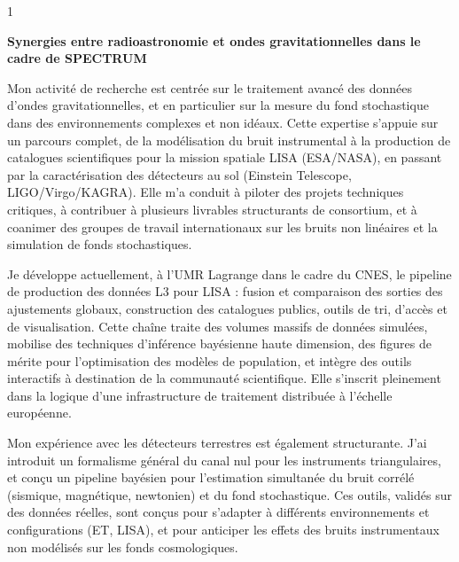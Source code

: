 \documentclass[10pt,a4paper]{../_shared/altacv}
\begin{document}
\makecvheader


\begin{paracol}{1}



{\color{body}
\textbf{Synergies entre radioastronomie et ondes gravitationnelles dans le cadre de SPECTRUM}

Mon activité de recherche est centrée sur le traitement avancé des données d'ondes gravitationnelles, et en particulier sur la mesure du fond stochastique dans des environnements complexes et non idéaux. Cette expertise s'appuie sur un parcours complet, de la modélisation du bruit instrumental à la production de catalogues scientifiques pour la mission spatiale LISA (ESA/NASA), en passant par la caractérisation des détecteurs au sol (Einstein Telescope, LIGO/Virgo/KAGRA). Elle m'a conduit à piloter des projets techniques critiques, à contribuer à plusieurs livrables structurants de consortium, et à coanimer des groupes de travail internationaux sur les bruits non linéaires et la simulation de fonds stochastiques.

Je développe actuellement, à l'UMR Lagrange dans le cadre du CNES, le pipeline de production des données L3 pour LISA : fusion et comparaison des sorties des ajustements globaux, construction des catalogues publics, outils de tri, d'accès et de visualisation. Cette chaîne traite des volumes massifs de données simulées, mobilise des techniques d'inférence bayésienne haute dimension, des figures de mérite pour l'optimisation des modèles de population, et intègre des outils interactifs à destination de la communauté scientifique. Elle s'inscrit pleinement dans la logique d'une infrastructure de traitement distribuée à l'échelle européenne.

Mon expérience avec les détecteurs terrestres est également structurante. J'ai introduit un formalisme général du canal nul pour les instruments triangulaires, et conçu un pipeline bayésien pour l'estimation simultanée du bruit corrélé (sismique, magnétique, newtonien) et du fond stochastique. Ces outils, validés sur des données réelles, sont conçus pour s'adapter à différents environnements et configurations (ET, LISA), et pour anticiper les effets des bruits instrumentaux non modélisés sur les fonds cosmologiques.

}
\end{paracol}
\end{document}
